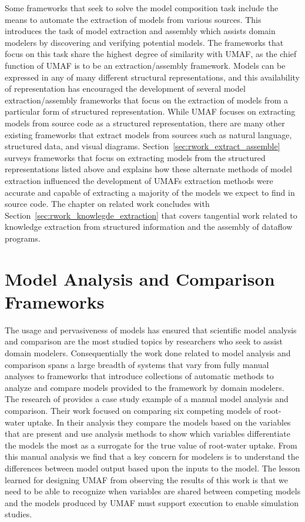 Some frameworks that seek to solve the model composition task include the means to automate the extraction of models from various sources.
This introduces the task of model extraction and assembly which assists domain modelers by discovering and verifying potential models.
The frameworks that focus on this task share the highest degree of similarity with UMAF, as the chief function of UMAF is to be an extraction/assembly framework.
Models can be expressed in any of many different structural representations, and this availability of representation has encouraged the development of several model extraction/assembly frameworks that focus on the extraction of models from a particular form of structured representation.
While UMAF focuses on extracting models from source code as a structured representation, there are many other existing frameworks that extract models from sources such as natural language, structured data, and visual diagrams.
Section~\ref{sec:rwork_extract_assemble} surveys frameworks that focus on extracting models from the structured representations listed above and explains how these alternate methods of model extraction influenced the development of UMAFs extraction methods were accurate and capable of extracting a majority of the models we expect to find in source code.
The chapter on related work concludes with Section~\ref{sec:rwork_knowlegde_extraction} that covers tangential work related to knowledge extraction from structured information and the assembly of dataflow programs.


\section{Model Analysis and Comparison Frameworks \label{sec:rwork_analysis_compare}}
The usage and pervasiveness of models has ensured that scientific model analysis and comparison are the most studied topics by researchers who seek to assist domain modelers.
Consequentially the work done related to model analysis and comparison spans a large breadth of systems that vary from fully manual analyses to frameworks that introduce collections of automatic methods to analyze and compare models provided to the framework by domain modelers.
The research of \citet{camargo2016six} provides a case study example of a manual model analysis and comparison.
Their work focused on comparing six competing models of root-water uptake.
In their analysis they compare the models based on the variables that are present and use analysis methods to show which variables differentiate the models the most as a surrogate for the true value of root-water uptake.
From this manual analysis we find that a key concern for modelers is to understand the differences between model output based upon the inputs to the model.
The lesson learned for designing UMAF from observing the results of this work is that we need to be able to recognize when variables are shared between competing models and the models produced by UMAF must support execution to enable simulation studies.

